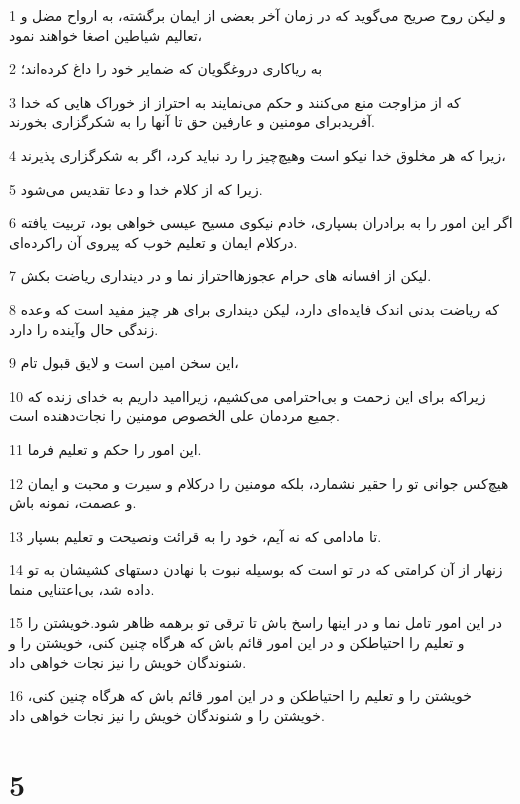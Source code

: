 \par 1 و لیکن روح صریح می‌گوید که در زمان آخر بعضی از ایمان برگشته، به ارواح مضل و تعالیم شیاطین اصغا خواهند نمود،
\par 2 به ریاکاری دروغگویان که ضمایر خود را داغ کرده‌اند؛
\par 3 که از مزاوجت منع می‌کنند و حکم می‌نمایند به احتراز از خوراک هایی که خدا آفریدبرای مومنین و عارفین حق تا آنها را به شکرگزاری بخورند.
\par 4 زیرا که هر مخلوق خدا نیکو است وهیچ‌چیز را رد نباید کرد، اگر به شکرگزاری پذیرند،
\par 5 زیرا که از کلام خدا و دعا تقدیس می‌شود.
\par 6 اگر این امور را به برادران بسپاری، خادم نیکوی مسیح عیسی خواهی بود، تربیت یافته درکلام ایمان و تعلیم خوب که پیروی آن راکرده‌ای.
\par 7 لیکن از افسانه های حرام عجوزهااحتراز نما و در دینداری ریاضت بکش.
\par 8 که ریاضت بدنی اندک فایده‌ای دارد، لیکن دینداری برای هر چیز مفید است که وعده زندگی حال وآینده را دارد.
\par 9 این سخن امین است و لایق قبول تام،
\par 10 زیراکه برای این زحمت و بی‌احترامی می‌کشیم، زیراامید داریم به خدای زنده که جمیع مردمان علی الخصوص مومنین را نجات‌دهنده است.
\par 11 این امور را حکم و تعلیم فرما.
\par 12 هیچ‌کس جوانی تو را حقیر نشمارد، بلکه مومنین را درکلام و سیرت و محبت و ایمان و عصمت، نمونه باش.
\par 13 تا مادامی که نه آیم، خود را به قرائت ونصیحت و تعلیم بسپار.
\par 14 زنهار از آن کرامتی که در تو است که بوسیله نبوت با نهادن دستهای کشیشان به تو داده شد، بی‌اعتنایی منما.
\par 15 در این امور تامل نما و در اینها راسخ باش تا ترقی تو برهمه ظاهر شود.خویشتن را و تعلیم را احتیاطکن و در این امور قائم باش که هرگاه چنین کنی، خویشتن را و شنوندگان خویش را نیز نجات خواهی داد.
\par 16 خویشتن را و تعلیم را احتیاطکن و در این امور قائم باش که هرگاه چنین کنی، خویشتن را و شنوندگان خویش را نیز نجات خواهی داد.

\chapter{5}

